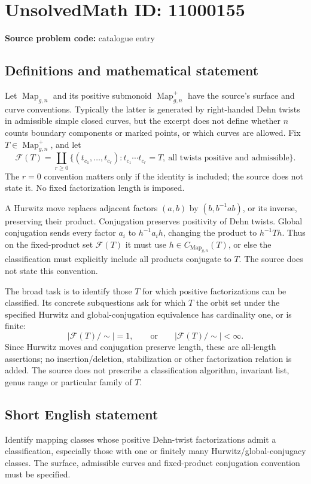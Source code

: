\documentclass[11pt]{article}
\begin{document}
\section*{UnsolvedMath ID: 11000155}
\textbf{Source problem code:} catalogue entry
\subsection{Definitions and mathematical statement}
Let \(\operatorname{Map}_{g,n}\) and its positive submonoid \(\operatorname{Map}_{g,n}^+\) have the source's surface and curve conventions. Typically the latter is generated by right-handed Dehn twists in admissible simple closed curves, but the excerpt does not define whether \(n\) counts boundary components or marked points, or which curves are allowed. Fix \(T\in\operatorname{Map}_{g,n}^+\), and let
\[\mathcal F(T)=\coprod_{r\geq0}\{(t_{c_1},\ldots,t_{c_r}):t_{c_1}\cdots t_{c_r}=T,\ \text{all twists positive and admissible}\}.\]
The \(r=0\) convention matters only if the identity is included; the source does not state it. No fixed factorization length is imposed.

A Hurwitz move replaces adjacent factors \((a,b)\) by \((b,b^{-1}ab)\), or its inverse, preserving their product. Conjugation preserves positivity of Dehn twists. Global conjugation sends every factor \(a_i\) to \(h^{-1}a_i h\), changing the product to \(h^{-1}Th\). Thus on the fixed-product set \(\mathcal F(T)\) it must use \(h\in C_{\operatorname{Map}_{g,n}}(T)\), or else the classification must explicitly include all products conjugate to \(T\). The source does not state this convention.

The broad task is to identify those \(T\) for which positive factorizations can be classified. Its concrete subquestions ask for which \(T\) the orbit set under the specified Hurwitz and global-conjugation equivalence has cardinality one, or is finite:
\[|\mathcal F(T)/\!\sim|=1,\qquad\text{or}\qquad|\mathcal F(T)/\!\sim|<\infty.\]
Since Hurwitz moves and conjugation preserve length, these are all-length assertions; no insertion/deletion, stabilization or other factorization relation is added. The source does not prescribe a classification algorithm, invariant list, genus range or particular family of \(T\).
\subsection{Short English statement}
Identify mapping classes whose positive Dehn-twist factorizations admit a classification, especially those with one or finitely many Hurwitz/global-conjugacy classes. The surface, admissible curves and fixed-product conjugation convention must be specified.
\end{document}
